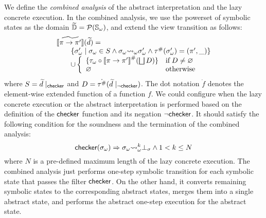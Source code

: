We define the \textit{combined analysis} of the abstract interpretation and the
lazy concrete execution.  In the combined analysis, we use the powerset of
symbolic states as the domain $\widetilde{\mathbb{D}} = \mathcal{P}({\mathbb{S}}_\omega)$, and extend the
view transition as follows:
\[
  \begin{array}{l}
    [\![{\widetilde{\pi \rightarrow \pi'}}]\!](\widetilde{d}) =\\
    \qquad \{
      {\sigma}_\omega' \mid {\sigma}_\omega \in S \wedge
      {\sigma}_\omega {\leadsto}_\omega {\sigma}_\omega' \wedge
      {\tau}^{\#}({\sigma}_\omega') = (\pi', \_)
    \}\\
    \qquad \cup \left\{
    \begin{array}{ll}
      \{ {\tau}_\omega \circ {[\![{\pi\rightarrow \pi'}]\!]}^{\#}(\bigsqcup D) \}
      & \text{if} \; D \neq \varnothing\\
      \varnothing & \text{otherwise}\\
    \end{array}
    \right.
  \end{array}
\]
where $S = \widetilde{d}\mid_{\textsf{checker}}$ and $D =
\dot{{\tau}^{\#}}(\widetilde{d}\mid_{\neg\textsf{checker}})$.  The dot notation $\dot{f}$
denotes the element-wise extended function of a function $f$.  We could
configure when the lazy concrete execution or the abstract interpretation
is performed based on the definition of the $\textsf{checker}$ function and its negation
$\neg\textsf{checker}$.  It should satisfy the following condition for the soundness and
the termination of the combined analysis:
\[
  \textsf{checker}({\sigma}_\omega) \Rightarrow {\sigma}_\omega {\leadsto}_\omega^k \bot_\sigma \wedge
  1 < k \leq N
\]
where $N$ is a pre-defined maximum length of the lazy concrete execution.
The combined analysis just performs one-step symbolic transition for each
symbolic state that passes the filter $\textsf{checker}$. On the other hand, it converts
remaining symbolic states to the corresponding abstract states, merges them into
a single abstract state, and performs the abstract one-step execution for the
abstract state.
